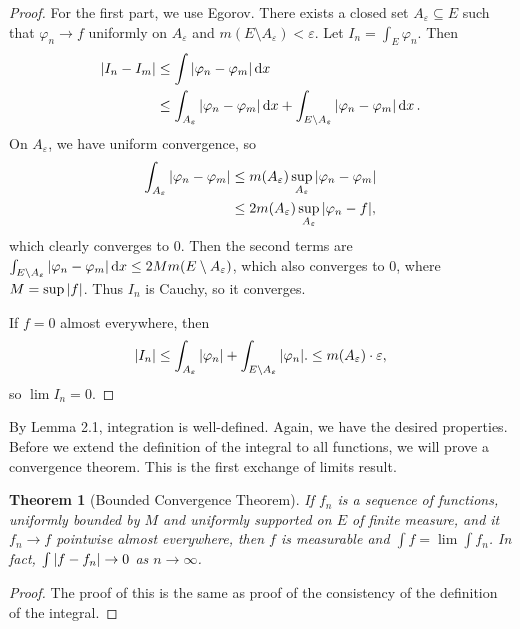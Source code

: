 \documentclass[leqno, openany]{memoir}
\newtheorem{thm}{Theorem}[chapter]
\theoremstyle{definition}
\theoremstyle{remark}
\theoremstyle{plain}
\theoremstyle{definition}
\theoremstyle{remark}
\newcommand{\ep}{\varepsilon}
\begin{document}
\begin{proof}
    For the first part, we use Egorov. There exists a closed set $A_{\ep} \subseteq E$ such that $\varphi_n \to f$ uniformly on $A_{\ep}$ and $m(E \setminus A_{\ep}) < \ep$. Let $I_n = \int_E \varphi_n$. Then
    \begin{align*}
        \abs{I_n - I_m} &\leq \int \abs{\varphi_n - \varphi_m} \dd{x} \\
                        &\leq \int_{A_{\ep}} \abs{\varphi_n - \varphi_m} \dd{x} + \int_{E \setminus A_{\ep}} \abs{\varphi_n - \varphi_m} \dd{x}. 
    \end{align*}
    On $A_{\ep}$, we have uniform convergence, so
    \begin{align*}
        \int_{A_{\ep}} \abs{\varphi_n - \varphi_m} &\leq m(A_{\ep}) \sup_{A_{\ep}} \abs{\varphi_n - \varphi_m} \\
                                                   &\leq 2m(A_{\ep}) \sup_{A_{\ep}} \abs{\varphi_n - f},
    \end{align*}
    which clearly converges to $0$. Then the second terms are $\int_{E \setminus A_{\ep}} \abs{\varphi_n - \varphi_m} \dd{x} \leq 2M m(E \setminus A_{\ep})$, which also converges to $0$, where $M = \sup \abs{f}$. Thus $I_n$ is Cauchy, so it converges.

    If $f = 0$ almost everywhere, then 
    \[ \abs{I_n} \leq \int_{A_{\ep}} \abs{\varphi_n} + \int_{E \setminus A_{\ep}} \abs{\varphi_n}. \leq m(A_{\ep}) \cdot \ep, \]
    so $\lim I_n = 0$.
\end{proof}

By Lemma 2.1, integration is well-defined. Again, we have the desired properties. Before we extend the definition of the integral to all functions, we will prove a convergence theorem. This is the first exchange of limits result.

\begin{thm}[Bounded Convergence Theorem]
    If $f_n$ is a sequence of functions, uniformly bounded by $M$ and uniformly supported on $E$ of finite measure, and it $f_n \to f$ pointwise almost everywhere, then $f$ is measurable and $\int f = \lim \int f_n$. In fact, $\int \abs{f - f_n} \to 0$ as $n \to \infty$.
\end{thm}

\begin{proof}
    The proof of this is the same as proof of the consistency of the definition of the integral.
\end{proof}
\end{document}
